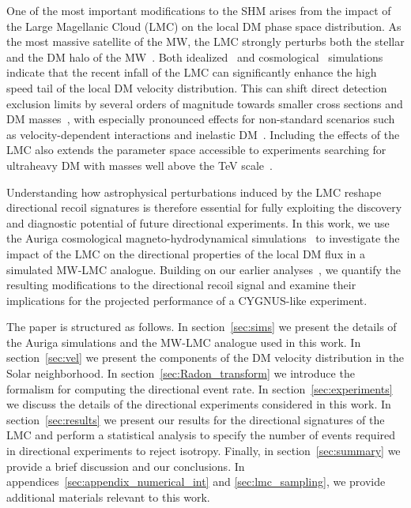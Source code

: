 \documentclass[a4paper,11pt]{article}
\begin{document}
One of the most important modifications to the SHM arises from the impact of the Large Magellanic Cloud (LMC) on the local DM phase space distribution. As the most massive satellite of the MW, the LMC strongly perturbs both the stellar and the DM halo of the MW~\cite{GaravitoCamargo:2021tcp, Garavito-Camargo:2020lqm, Conroy_2021, Petersen_2020,  Peterson_2020_MNRAS, Cunningham:2020nlo, Cavieres_2025}. Both idealized~\cite{Besla:2019xbx,Donaldson:2021byu} and cosmological~\cite{Smith-Orlik:2023kyl} simulations indicate that the recent infall of the LMC can significantly enhance the high speed tail of the local DM velocity distribution. This can shift direct detection exclusion
limits by several orders of magnitude towards smaller cross sections and DM masses~\cite{Besla:2019xbx, Smith-Orlik:2023kyl}, with especially pronounced effects for non-standard scenarios such as velocity-dependent interactions and inelastic DM~\cite{Reynoso-Cordova:2024lmc}. Including the effects of the LMC also extends the parameter space accessible to experiments searching for ultraheavy DM with masses well above the TeV scale~\cite{Bozorgnia:2025lsl}. 

Understanding how astrophysical perturbations induced by the LMC reshape directional recoil signatures is therefore essential for fully exploiting the discovery and diagnostic potential of future directional experiments. In this work, we use the Auriga cosmological magneto-hydrodynamical simulations~\cite{Grand:2016mgo} to investigate the impact of the LMC on the directional properties of the local DM flux in a simulated MW-LMC analogue. Building on our earlier analyses~\cite{Smith-Orlik:2023kyl, Reynoso-Cordova:2024lmc}, we quantify the resulting modifications to the directional recoil signal and examine their implications for the projected performance of a CYGNUS-like experiment.

The paper is structured as follows. In section~\ref{sec:sims} we present the details of the Auriga simulations and the MW-LMC analogue used in this work. In section~\ref{sec:vel} we present the  components of the DM velocity distribution in the Solar neighborhood. In section~\ref{sec:Radon_transform} we introduce the formalism for computing the directional event rate. In section~\ref{sec:experiments} we discuss the details of the directional experiments considered in this work. In section~\ref{sec:results} we present our results for the directional signatures of the LMC and perform a statistical analysis to specify the number of events required in directional experiments to reject isotropy. Finally, in section~\ref{sec:summary} we provide a brief discussion and our conclusions. In appendices~\ref{sec:appendix_numerical_int} and \ref{sec:lmc_sampling}, we provide additional materials relevant to this work.
\end{document}
